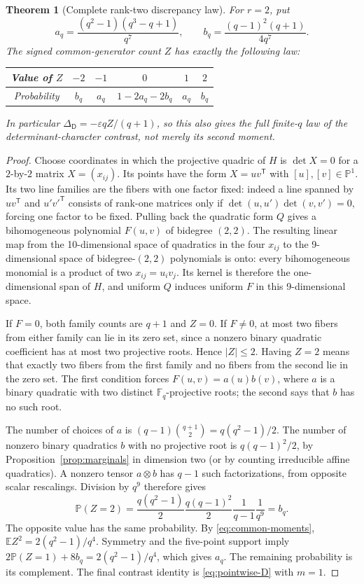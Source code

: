 \documentclass[11pt,a4paper]{article}
\newtheorem{theorem}{Theorem}[section]
\theoremstyle{definition}
\theoremstyle{remark}
\newcommand{\F}{\mathbb F}
\newcommand{\E}{\mathbb E}
\newcommand{\Pp}{\mathbb P}
\newcommand{\eps}{\varepsilon}
\newcommand{\D}{\mathsf D}
\begin{document}
\begin{theorem}[Complete rank-two discrepancy law]\label{thm:rank-two-law}
For $r=2$, put
\[
 a_q=\frac{(q^2-1)(q^3-q+1)}{q^7},\qquad
 b_q=\frac{(q-1)^2(q+1)}{4q^7}.
\]
The signed common-generator count $Z$ has exactly the following law:
\begin{center}
\begin{tabular}{@{}cccccc@{}}
\toprule
Value of $Z$&$-2$&$-1$&$0$&$1$&$2$\\
\midrule
Probability&$b_q$&$a_q$&$1-2a_q-2b_q$&$a_q$&$b_q$\\
\bottomrule
\end{tabular}
\end{center}
In particular $\Delta_\D=-\eps qZ/(q+1)$, so this also gives the full
finite-$q$ law of the determinant-character contrast, not merely its
second moment.
\end{theorem}
\begin{proof}
Choose coordinates in which the projective quadric of $H$ is
$\det X=0$ for a $2$-by-$2$ matrix $X=(x_{ij})$.
Its points have the form $X=uv^{\mathsf T}$ with $[u],[v]\in\mathbb P^1$.
Its two line families are the fibers with one factor fixed: indeed a
line spanned by $uv^{\mathsf T}$ and $u'v'^{\mathsf T}$ consists of
rank-one matrices only if
$\det(u,u')\det(v,v')=0$, forcing one factor to be fixed.
Pulling back the quadratic form $Q$ gives a bihomogeneous polynomial
$F(u,v)$ of bidegree $(2,2)$. The resulting linear map from the
10-dimensional space of quadratics in the four $x_{ij}$ to the
9-dimensional space of bidegree-$(2,2)$ polynomials is onto: every
bihomogeneous monomial is a product of two $x_{ij}=u_iv_j$.
Its kernel is therefore the one-dimensional span of $H$, and uniform
$Q$ induces uniform $F$ in this 9-dimensional space.

If $F=0$, both family counts are $q+1$ and $Z=0$. If $F\ne0$, at most
two fibers from either family can lie in its zero set, since a nonzero
binary quadratic coefficient has at most two projective roots.
Hence $|Z|\le2$. Having $Z=2$ means that exactly two fibers from the
first family and no fibers from the second lie in the zero set.
The first condition forces
$F(u,v)=a(u)b(v)$, where $a$ is a binary quadratic with two distinct
$\F_q$-projective roots; the second says that $b$ has no such root.

The number of choices of $a$ is
$(q-1)\binom{q+1}{2}=q(q^2-1)/2$.
The number of nonzero binary quadratics $b$ with no projective root is
$q(q-1)^2/2$, by Proposition~\ref{prop:marginals} in dimension two
(or by counting irreducible affine quadratics).
A nonzero tensor $a\otimes b$ has $q-1$ such factorizations, from
opposite scalar rescalings. Division by $q^9$ therefore gives
\[
 \Pp(Z=2)=\frac{q(q^2-1)}2\frac{q(q-1)^2}2
          \frac1{q-1}\frac1{q^9}
 =b_q.
\]
The opposite value has the same probability. By
\eqref{eq:common-moments}, $\E Z^2=2(q^2-1)/q^4$.
Symmetry and the five-point support imply
$2\Pp(Z=1)+8b_q=2(q^2-1)/q^4$, which gives $a_q$.
The remaining probability is its complement. The final contrast
identity is \eqref{eq:pointwise-D} with $m=1$.
\end{proof}
\end{document}
